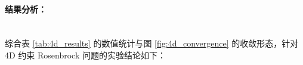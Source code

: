 \documentclass[a4paper,12pt]{article}
\begin{document}

    

\paragraph{结果分析：} \mbox{} \\

综合表 \ref{tab:4d_results} 的数值统计与图 \ref{fig:4d_convergence} 的收敛形态，针对 4D 约束 Rosenbrock 问题的实验结论如下：
\end{document}
